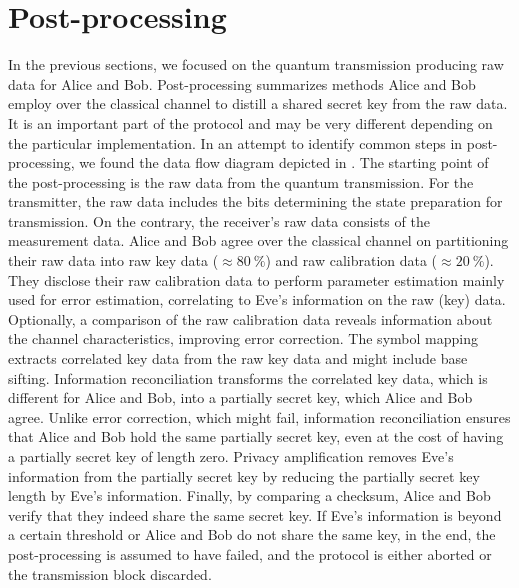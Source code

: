 \section{Post-processing}

In the previous sections, we focused on the quantum transmission producing raw data for Alice and Bob.
Post-processing summarizes methods Alice and Bob employ over the classical channel to distill a shared secret key from the raw data.
It is an important part of the protocol and may be very different depending on the particular implementation.
In an attempt to identify common steps in post-processing, we found the data flow diagram depicted in .
The starting point of the post-processing is the raw data from the quantum transmission.
For the transmitter, the raw data includes the bits determining the state preparation for transmission.
On the contrary, the receiver's raw data consists of the measurement data.
Alice and Bob agree over the classical channel on partitioning their raw data into raw key data ($\approx\SI{80}{\percent}$) and raw calibration data ($\approx\SI{20}{\percent}$).
They disclose their raw calibration data to perform parameter estimation mainly used for error estimation, correlating to Eve's information on the raw (key) data.
Optionally, a comparison of the raw calibration data reveals information about the channel characteristics, improving error correction.
The symbol mapping extracts correlated key data from the raw key data and might include base sifting.
Information reconciliation transforms the correlated key data, which is different for Alice and Bob, into a partially secret key, which Alice and Bob agree.
Unlike error correction, which might fail, information reconciliation ensures that Alice and Bob hold the same partially secret key, even at the cost of having a partially secret key of length zero.
Privacy amplification removes Eve's information from the partially secret key by reducing the partially secret key length by Eve's information.
Finally, by comparing a checksum, Alice and Bob verify that they indeed share the same secret key.
If Eve's information is beyond a certain threshold or Alice and Bob do not share the same key, in the end, the post-processing is assumed to have failed, and the protocol is either aborted or the transmission block discarded.
